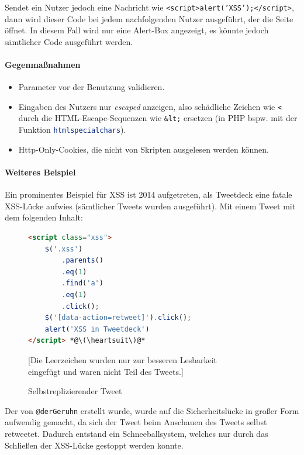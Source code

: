 \documentclass[a4paper, 11pt, accentcolor = tud3b]{tudreport}
\begin{document}
							Sendet ein Nutzer jedoch eine Nachricht wie \texttt{<script>alert('XSS');</script>}, dann wird dieser Code bei jedem nachfolgenden Nutzer ausgeführt, der die Seite öffnet. In diesem Fall wird nur eine Alert-Box angezeigt, es könnte jedoch sämtlicher Code ausgeführt werden.
						
						\paragraph{Gegenmaßnahmen}
							\begin{itemize}
								\item Parameter vor der Benutzung validieren.
								\item Eingaben des Nutzers nur \textit{escaped} anzeigen, also schädliche Zeichen wie \texttt{<} durch die HTML-Escape-Sequenzen wie \texttt{\&lt;} ersetzen (in PHP bspw. mit der Funktion \lstinline[language = PHP]|htmlspecialchars|).
								\item Http-Only-Cookies, die nicht von Skripten ausgelesen werden können.
							\end{itemize}
						
						\paragraph{Weiteres Beispiel}
							Ein prominentes Beispiel für XSS ist 2014 aufgetreten, als Tweetdeck eine fatale XSS-Lücke aufwies (sämtlicher Tweets wurden ausgeführt). Mit einem Tweet mit dem folgenden Inhalt:
							\begin{figure}[H]
								\centering
								\begin{lstlisting}[language = HTML]
<script class="xss">
	$('.xss')
		.parents()
		.eq(1)
		.find('a')
		.eq(1)
		.click();
	$('[data-action=retweet]').click();
	alert('XSS in Tweetdeck')
</script> *@\(\heartsuit\)@*
\end{lstlisting}
								[Die Leerzeichen wurden nur zur besseren Lesbarkeit \\ eingefügt und waren nicht Teil des Tweets.]
								\caption{Selbstreplizierender Tweet}
							\end{figure}
							Der von \texttt{@derGeruhn} erstellt wurde, wurde auf die Sicherheitslücke in großer Form aufwendig gemacht, da sich der Tweet beim Anschauen des Tweets selbst retweetet. Dadurch entstand ein Schneeballsystem, welches nur durch das Schließen der XSS-Lücke gestoppt werden konnte.
		
\end{document}
